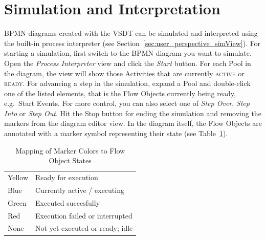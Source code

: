 \section{Simulation and Interpretation}
\label{sec:user_features_sim}

BPMN diagrams created with the VSDT can be simulated and interpreted using the built-in process
interpreter (see Section~\ref{sec:user_perspective_simView}). For starting a simulation, first
switch to the BPMN diagram you want to simulate. Open the \emph{Process Interpreter} view and click
the \emph{Start} button. For each Pool in the diagram, the view will show those Activities that are
currently \textsc{active} or \textsc{ready}. For advancing a step in the simulation, expand a Pool
and double-click one of the listed elements, that is the Flow Objects currently being ready, e.g.\
Start Events. For more control, you can also select one of \emph{Step Over}, \emph{Step Into} or
\emph{Step Out}. Hit the Stop button for ending the simulation and removing the markers from the
diagram editor view. In the diagram itself, the Flow Objects are annotated with a marker symbol
representing their state (see Table~\ref{tab:markerColors}).
\begin{table}[ht]
	\centering
	\caption{Mapping of Marker Colors to Flow Object States}
	\label{tab:markerColors}
	\begin{tabular}{|l|l|}
		\hline
		Yellow & Ready for execution             \\
		Blue   & Currently active / executing    \\
		Green  & Executed succesfully            \\
		Red    & Execution failed or interrupted \\
		None   & Not yet executed or ready; idle \\
		\hline
	\end{tabular}
\end{table}

